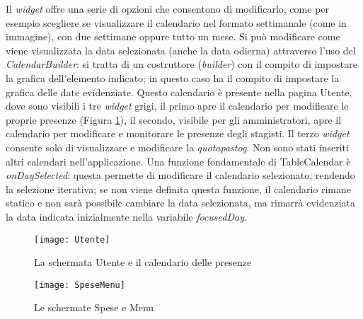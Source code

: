 Il \emph{widget} offre una serie di opzioni che consentono di modificarlo, come per esempio scegliere se visualizzare il calendario nel formato settimanale (come in immagine), con due settimane oppure tutto un mese.\newline
Si può modificare come viene visualizzata la data selezionata (anche la data odierna) attraverso l'uso del \emph{CalendarBuilder}: si tratta di un costruttore (\emph{builder}) con il compito di impostare la grafica dell'elemento indicato; in questo caso ha il compito di impostare la grafica delle date evidenziate.\newline
\newline
Questo calendario è presente nella pagina Utente, dove sono visibili i tre \emph{widget} grigi, il primo apre il calendario per modificare le proprie presenze (Figura \ref{fig:utente-presenze}), il secondo, visibile per gli amministratori, apre il calendario per modificare e monitorare le presenze degli stagisti.\newline
Il terzo \emph{widget} consente solo di visualizzare e modificare la \emph{\gls{quotapastog}}.\newline
Non sono stati inseriti altri calendari nell'applicazione.\newline
\newline
Una funzione fondamentale di TableCalendar è \emph{onDaySelected}: questa permette di modificare il calendario selezionato, rendendo la selezione iterativa; se non viene definita questa funzione, il calendario rimane statico e non sarà possibile cambiare la data selezionata, ma rimarrà evidenziata la data indicata inizialmente nella variabile \emph{focusedDay}.
\newpage
\begin{figure}[!h] 
    \centering 
    \texttt{[image: Utente]} 
    \caption{La schermata Utente e il calendario delle presenze}
    \label{fig:utente-presenze}
\end{figure}
\begin{figure}[!h] 
    \centering 
    \texttt{[image: SpeseMenu]} 
    \caption{Le schermate Spese e Menu}
    \label{fig:spese-menu}
\end{figure}
\newpage

